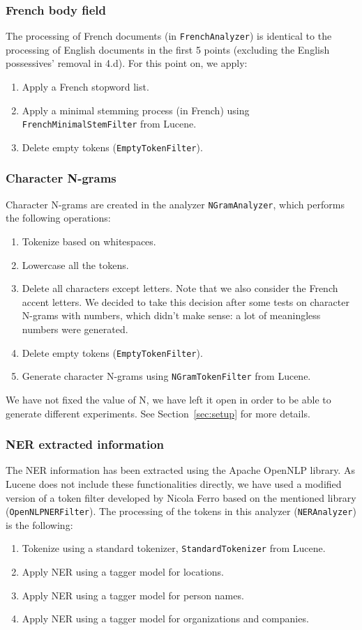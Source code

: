 \subsubsection{French body field}
The processing of French documents (in \texttt{FrenchAnalyzer}) is identical to the processing of English documents in
the first 5 points (excluding the English possessives' removal in 4.d).
For this point on, we apply:
\begin{enumerate}[start=6]
    \item Apply a French stopword list\cite{stopword_french}.
    \item Apply a minimal stemming process (in French) using \texttt{FrenchMinimalStemFilter} from Lucene.
    \item Delete empty tokens (\texttt{EmptyTokenFilter}).
\end{enumerate}

\subsubsection{Character N-grams}
Character N-grams are created in the analyzer \texttt{NGramAnalyzer}, which performs the following operations:
\begin{enumerate}
    \item Tokenize based on whitespaces.
    \item Lowercase all the tokens.
    \item Delete all characters except letters.
    Note that we also consider the French accent letters.
    We decided to take this decision after some tests on character N-grams with numbers, which didn't make sense: a lot of meaningless numbers were generated.
    \item Delete empty tokens (\texttt{EmptyTokenFilter}).
    \item Generate character N-grams using \texttt{NGramTokenFilter} from Lucene.
\end{enumerate}
We have not fixed the value of N, we have left it open in order to be able to generate different experiments.
See Section~\ref{sec:setup} for more details.

\subsubsection{NER extracted information}
The NER information has been extracted using the Apache OpenNLP\cite{ApacheOpenNLP} library.
As Lucene does not include these functionalities directly, we have used a modified version of a token filter developed by Nicola Ferro based on the mentioned library (\texttt{OpenNLPNERFilter}).
The processing of the tokens in this analyzer (\texttt{NERAnalyzer}) is the following:
\begin{enumerate}
    \item Tokenize using a standard tokenizer, \texttt{StandardTokenizer} from Lucene.
    \item Apply NER using a tagger model for locations.
    \item Apply NER using a tagger model for person names.
    \item Apply NER using a tagger model for organizations and companies.
\end{enumerate}

